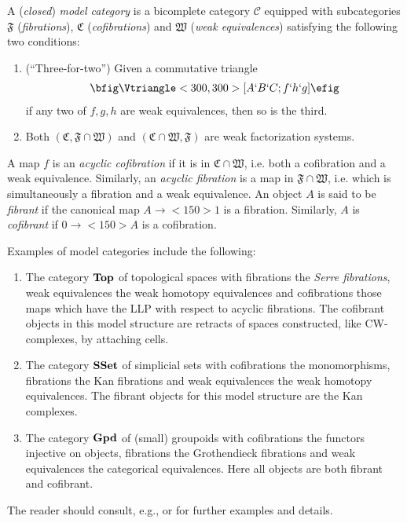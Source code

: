\documentclass{amsart}
\newcommand{\groupoids}{\textnormal{\textbf{Gpd}}}
\newcommand{\topcat}{\textnormal{\textbf{Top}}}
\newcommand{\ssets}{\textnormal{\textbf{SSet}}}
\theoremstyle{definition}
\theoremstyle{remark}
\begin{document}
A (\emph{closed}) \emph{model category} \cite{Quillen:HA} is a bicomplete category $\mathcal{C}$
equipped with subcategories $\mathfrak{F}$ (\emph{fibrations}), $\mathfrak{C}$
(\emph{cofibrations}) and $\mathfrak{W}$ (\emph{weak equivalences})
satisfying the following two conditions:
\begin{enumerate}
\item (``Three-for-two'') Given a commutative triangle
  \begin{align*}
    \bfig
    \Vtriangle<300,300>[A`B`C;f`h`g]
    \efig
  \end{align*}
  if any two of $f,g,h$ are weak equivalences, then so is the third.
\item Both $(\mathfrak{C},\mathfrak{F}\cap\mathfrak{W})$ and
$(\mathfrak{C}\cap\mathfrak{W},\mathfrak{F})$ are weak factorization systems.
\end{enumerate}
A map $f$ is an \emph{acyclic cofibration} if it is in
$\mathfrak{C}\cap\mathfrak{W}$, i.e. both a
cofibration and a weak equivalence.  Similarly, an \emph{acyclic
  fibration} is a map in $\mathfrak{F}\cap\mathfrak{W}$, i.e. which is
simultaneously a fibration and a weak
equivalence.  An object $A$ is said to be \emph{fibrant} if the
canonical map $A\to<150>1$ is a fibration.  Similarly, $A$ is
\emph{cofibrant} if $0\to<150>A$ is a cofibration.

Examples of model categories include the following:
\begin{enumerate}
\item The category $\topcat$ of topological spaces with fibrations the
  \emph{Serre fibrations}, weak equivalences the weak homotopy
  equivalences and cofibrations those maps which have the LLP with
  respect to acyclic fibrations.  The cofibrant objects in this model
  structure are retracts of spaces constructed, like CW-complexes, by
  attaching cells.
\item The category $\ssets$ of simplicial sets with cofibrations the
  monomorphisms, fibrations the Kan fibrations and weak equivalences
  the weak homotopy equivalences.  The fibrant objects for this model
  structure are the Kan complexes.
\item The category $\groupoids$ of (small) groupoids with cofibrations
  the functors injective on objects, fibrations the Grothendieck
  fibrations and weak equivalences the categorical equivalences.  Here
  all objects are both fibrant and cofibrant.
\end{enumerate}
The reader should consult, e.g., \cite{Hovey:MC} or \cite{Dwyer:HTMC}
for further examples and details.
\end{document}
